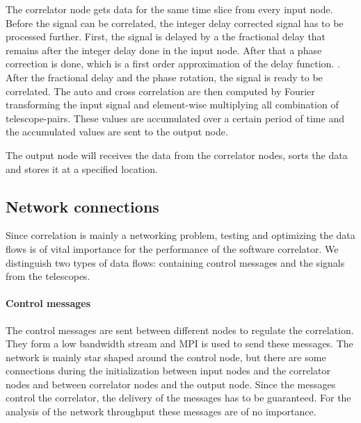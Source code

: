 The correlator node gets data for the same time slice from every input
node. Before the signal can be correlated, the integer delay corrected
signal has to be processed further. First, the signal is delayed by a
the fractional delay that remains after the integer delay done in the
input node. After that a phase correction is done, which is a first
order approximation of the delay function. . After the fractional delay and the phase rotation, the
signal is ready to be correlated. The auto and cross correlation are
then computed by Fourier transforming the input signal and
element-wise multiplying all combination of telescope-pairs. These
values are accumulated over a certain period of time and the
accumulated values are sent to the output node.

The output node will receives the data from the correlator nodes,
sorts the data and stores it at a specified location.

\subsection{Network connections}

Since correlation is mainly a networking problem, testing and
optimizing the data flows is of vital importance for the performance
of the software correlator. We distinguish two types of data flows:
containing control messages and the signals from the telescopes. 

\paragraph{Control messages}
The control messages are sent between different nodes to regulate the
correlation. They form a low bandwidth stream and MPI is used to send
these messages. The network is mainly star shaped around the control
node, but there are some connections during the initialization between
input nodes and the correlator nodes and between correlator nodes and
the output node. Since the messages control the correlator, the
delivery of the messages has to be guaranteed. For the analysis of the
network throughput these messages are of no importance.

